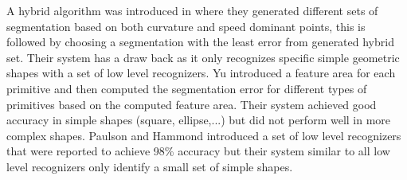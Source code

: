 \documentclass{article}%
\begin{document}
A hybrid algorithm was introduced in \cite{earlyprocess} where they generated different sets of segmentation based on both curvature and speed dominant points, this is followed by choosing a segmentation with the least error from generated hybrid set. Their system has a draw back as it only recognizes specific simple geometric shapes with a set of low level recognizers. Yu introduced a feature area for each primitive and then computed the segmentation error for different types of primitives based on the computed feature area. Their system achieved good accuracy in simple shapes (square, ellipse,...) but did not perform well in more complex shapes\cite{meanshift10}. Paulson and Hammond\cite{Paleosketch08} introduced a set of low level recognizers that were reported to achieve 98\%  accuracy but their system similar to all low level recognizers only identify a small set of simple shapes. 

\end{document}
